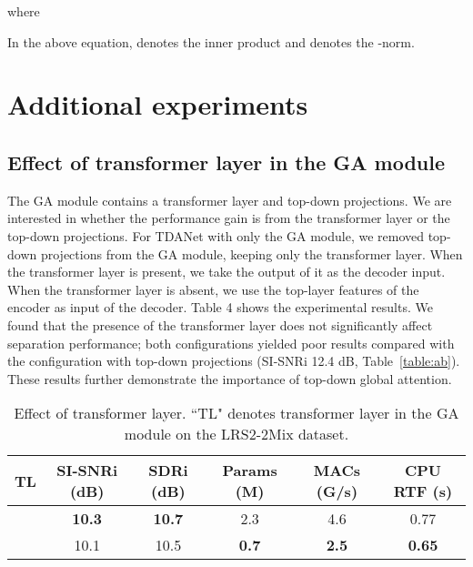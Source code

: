 \documentclass{article} \usepackage{iclr2023_conference,times}
\begin{document}
where

In the above equation,  denotes the inner product and  denotes the -norm.

\section{Additional experiments}
\label{sec:ae}
\subsection{Effect of transformer layer in the GA module}
\label{sec:a-tl}

The GA module contains a transformer layer and top-down projections. We are interested in whether the performance gain is from the transformer layer or the top-down projections. For TDANet with only the GA module, we removed top-down projections from the GA module, keeping only the transformer layer. When the transformer layer is present, we take the output of it as the decoder input. When the transformer layer is absent, we use the top-layer features of the encoder as input of the decoder. Table 4 shows the experimental results. We found that the presence of the transformer layer does not significantly affect separation performance; both configurations yielded poor results compared with the configuration with top-down projections (SI-SNRi 12.4 dB, Table~\ref{table:ab}). These results further demonstrate the importance of top-down global attention.
\begin{table}[ht]
\caption{Effect of transformer layer. ``TL" denotes transformer layer in the GA module on the LRS2-2Mix dataset.}
\label{table:tl}
\footnotesize
\begin{center}
\begin{tabular}{cccccc}
\toprule
TL & SI-SNRi (dB) & SDRi (dB) & Params (M) & MACs (G/s) & CPU RTF (s) \\
\midrule
 & \textbf{10.3} & \textbf{10.7} & 2.3 & 4.6 & 0.77\\
 & 10.1 & 10.5 & \textbf{0.7} & \textbf{2.5} & \textbf{0.65}\\
\bottomrule
\end{tabular}
\end{center}
\end{table}
\end{document}
